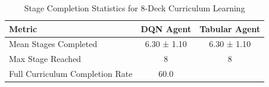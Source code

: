 \begin{table}[h!]
\centering
\caption{Stage Completion Statistics for 8-Deck Curriculum Learning}
\label{tab:stage_completion_8deck}
\begin{tabular}{lcc}
\hline
Metric & DQN Agent & Tabular Agent \\
\hline
Mean Stages Completed & 6.30 ± 1.10 & 6.30 ± 1.10 \\
Max Stage Reached & 8 & 8 \\
Full Curriculum Completion Rate & 60.0%
\hline
\end{tabular}
\end{table}

